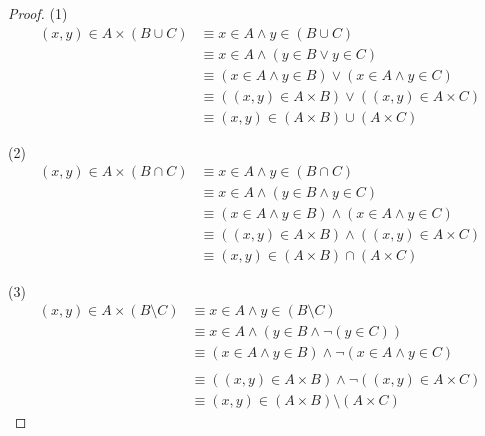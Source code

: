 \begin{proof}
(1)
\begin{align*}
(x,y) \in A \times (B \cup C) &\equiv x \in A \wedge y \in (B \cup C) \\
&\equiv x \in A \wedge (y \in B \vee y \in C) \\
&\equiv (x \in A \wedge y \in B) \vee (x \in A \wedge y \in C) \\
&\equiv ((x,y) \in A \times B) \vee ((x,y) \in A \times C) \\
&\equiv (x,y) \in (A \times B) \cup (A \times C)
\end{align*}

(2)
\begin{align*}
(x,y) \in A \times (B \cap C) &\equiv x \in A \wedge y \in (B \cap C) \\
&\equiv x \in A \wedge (y \in B \wedge y \in C) \\
&\equiv (x \in A \wedge y \in B) \wedge (x \in A \wedge y \in C) \\
&\equiv ((x,y) \in A \times B) \wedge ((x,y) \in A \times C) \\
&\equiv (x,y) \in (A \times B) \cap (A \times C)
\end{align*}

(3)
\begin{align*}
(x,y) \in A \times (B \setminus C) &\equiv x \in A \wedge y \in (B \setminus C) \\
&\equiv x \in A \wedge (y \in B \wedge \neg (y \in C)) \\
&\equiv (x \in A \wedge y \in B) \wedge \neg (x \in A \wedge y \in C) \\
\tag{The statement $x \in A$ implies $\neg (x \in A \wedge y \in C) 
\Longrightarrow \neg (y \in C)$}\\
&\equiv ((x,y) \in A \times B) \wedge \neg((x,y) \in A \times C) \\
&\equiv (x,y) \in (A \times B) \setminus (A \times C)
\end{align*}
\end{proof}


